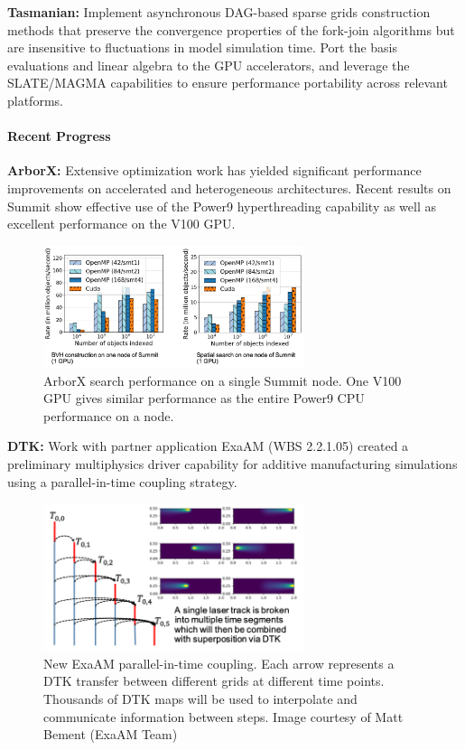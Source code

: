 {\bf Tasmanian:} Implement asynchronous DAG-based sparse grids construction
methods that preserve the convergence properties of the fork-join algorithms
but are insensitive to fluctuations in model simulation time.  Port the basis
evaluations and linear algebra to the GPU accelerators, and leverage the
SLATE/MAGMA capabilities to ensure performance portability across relevant
platforms.



\paragraph{Recent Progress}

\indent

{\bf ArborX:} Extensive optimization work has yielded significant performance
improvements on accelerated and heterogeneous architectures. Recent results on
Summit show effective use of the Power9 hyperthreading capability as well as
excellent performance on the V100 GPU.

\begin{figure}[htb]
        \centering \includegraphics[width=3.0in]{projects/2.3.3-MathLibs/2.3.3.14-ALExa-ForTrilinos/arborx_summit.png} \caption{\label{fig:arborx-gpu}
        ArborX search performance on a single Summit node. One V100 GPU gives
        similar performance as the entire Power9 CPU performance on a node.}
\end{figure}

{\bf DTK:} Work with partner application ExaAM (WBS 2.2.1.05) created a
preliminary multiphysics driver capability for additive manufacturing
simulations using a parallel-in-time coupling strategy.

\begin{figure}[htb]
        \centering \includegraphics[width=3.0in]{projects/2.3.3-MathLibs/2.3.3.14-ALExa-ForTrilinos/dtk_exaam_pit.png} \caption{\label{fig:dtk-exaam-pit}
        New ExaAM parallel-in-time coupling. Each arrow represents a DTK
        transfer between different grids at different time points. Thousands
        of DTK maps will be used to interpolate and communicate information
        between steps. Image courtesy of Matt Bement (ExaAM Team) }
\end{figure}

